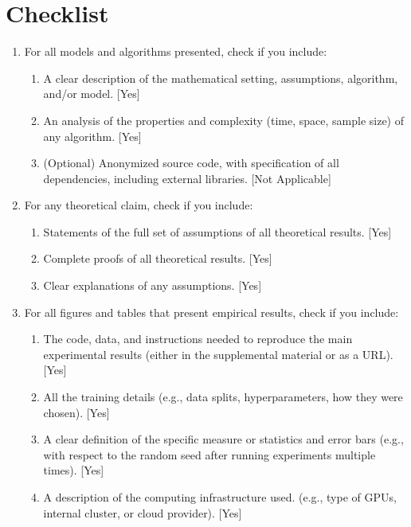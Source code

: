 
\section*{Checklist}


\begin{enumerate}

  \item For all models and algorithms presented, check if you include:
  \begin{enumerate}
    \item A clear description of the mathematical setting, assumptions, algorithm, and/or model. [Yes]
    \item An analysis of the properties and complexity (time, space, sample size) of any algorithm. [Yes]
    \item (Optional) Anonymized source code, with specification of all dependencies, including external libraries. [Not Applicable]
  \end{enumerate}

  \item For any theoretical claim, check if you include:
  \begin{enumerate}
    \item Statements of the full set of assumptions of all theoretical results. [Yes]
    \item Complete proofs of all theoretical results. [Yes]
    \item Clear explanations of any assumptions. [Yes]     
  \end{enumerate}

  \item For all figures and tables that present empirical results, check if you include:
  \begin{enumerate}
    \item The code, data, and instructions needed to reproduce the main experimental results (either in the supplemental material or as a URL). [Yes]
    \item All the training details (e.g., data splits, hyperparameters, how they were chosen). [Yes]
    \item A clear definition of the specific measure or statistics and error bars (e.g., with respect to the random seed after running experiments multiple times). [Yes]
    \item A description of the computing infrastructure used. (e.g., type of GPUs, internal cluster, or cloud provider). [Yes]
  \end{enumerate}


\end{enumerate}
